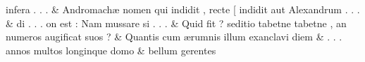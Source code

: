 \documentclass[12pt,onecolumn,twoside,a4paper]{memoir}
\begin{document}
\begin{pairs}
\begin{Leftside}
                              infera
                              .
                              .
                              . \&
                         \stanza {}
                     Andromachæ
                              nomen
                              qui
                              indidit
                              ,
                              recte
                              [
                              indidit
                              aut
                              Alexandrum
                              .
                              .
                              . \&
                         \stanza {}
                     di
                              .
                              .
                              .
                              on
                              est
                              :
                              Nam
                              mussare
                              si
                              .
                              .
                              . \&
                         \stanza {}
                     Quid
                              fit
                              ?
                              seditio
                              tabetne
                              {tabetne}
                              ,
                              an
                              numeros
                              augificat
                              suos
                              ? \&
                         \stanza {}
                     Quantis
                              cum
                              ærumnis
                              illum
                              exanclavi
                              diem \&
                         \stanza {}.
                              .
                              .
                              annos
                              multos
                              longinque
                              domo & 
                     bellum
                              gerentes

\end{Leftside}
\end{pairs}
\end{document}

